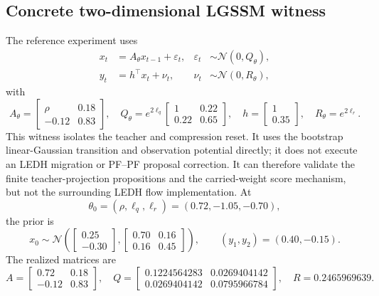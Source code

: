 \subsection{Concrete two-dimensional LGSSM witness}

The reference experiment uses
\begin{align}
  x_t&=A_\theta x_{t-1}+\varepsilon_t,
    &\varepsilon_t&\sim\mathcal N(0,Q_\theta),\\
  y_t&=h^\top x_t+\nu_t,
    &\nu_t&\sim\mathcal N(0,R_\theta),
\end{align}
with
\begin{equation}
\label{eq:bf-ledh-score-aware-lgssm-numbers}
  A_\theta=\begin{bmatrix}\rho&0.18\\-0.12&0.83\end{bmatrix},\quad
  Q_\theta=e^{2\ell_q}
    \begin{bmatrix}1&0.22\\0.22&0.65\end{bmatrix},\quad
  h=\begin{bmatrix}1\\0.35\end{bmatrix},\quad
  R_\theta=e^{2\ell_r}.
\end{equation}
This witness isolates the teacher and compression reset.  It uses the bootstrap
linear-Gaussian transition and observation potential directly; it does not
execute an LEDH migration or PF--PF proposal correction.  It can therefore
validate the finite teacher-projection propositions and the carried-weight
score mechanism, but not the surrounding LEDH flow implementation.
At
\[
  \theta_0=(\rho,\ell_q,\ell_r)=(0.72,-1.05,-0.70),
\]
the prior is
\[
  x_0\sim\mathcal N\!\left(
    \begin{bmatrix}0.25\\-0.30\end{bmatrix},
    \begin{bmatrix}0.70&0.16\\0.16&0.45\end{bmatrix}
  \right),\qquad (y_1,y_2)=(0.40,-0.15).
\]
The realized matrices are
\[
  A=\begin{bmatrix}0.72&0.18\\-0.12&0.83\end{bmatrix},\quad
  Q=\begin{bmatrix}
    0.1224564283&0.0269404142\\
    0.0269404142&0.0795966784
  \end{bmatrix},\quad
  R=0.2465969639.
\]

